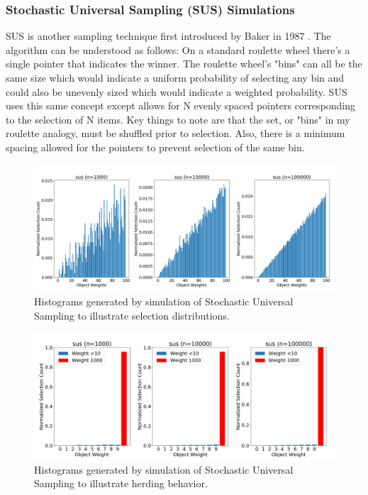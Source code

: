 \documentclass[12pt]{article}
\begin{document}
    \subsubsection{Stochastic Universal Sampling (SUS) Simulations}
    SUS is another sampling technique first introduced by Baker in 1987
    \cite{baker1987}. The algorithm can be understood as follows: On a
    standard roulette wheel there's a single pointer that indicates the winner.
    The roulette wheel's "bins" can all be the same size which would indicate a
    uniform probability of selecting any bin and could also be unevenly sized
    which would indicate a weighted probability. SUS uses this same concept
    except allows for N evenly spaced pointers corresponding to the selection
    of N items. Key things to note are that the set, or "bins" in my roulette
    analogy, must be shuffled prior to selection. Also, there is a minimum
    spacing allowed for the pointers to prevent selection of the same bin.

    \begin{figure}[htbp]
      \centering
      \includegraphics[scale=0.32]{images/herding_roullette.png} 
      \caption{Histograms generated by simulation of Stochastic Universal
               Sampling to illustrate selection distributions.}
      \label{fig:herding_roullette}
    \end{figure}

    \begin{figure}[htbp]
      \centering
      \includegraphics[scale=0.32]{images/pathological_roullette.png} 
      \caption{Histograms generated by simulation of Stochastic Universal
               Sampling to illustrate herding behavior.}
      \label{fig:pathological_roullette}
    \end{figure}
\end{document}

